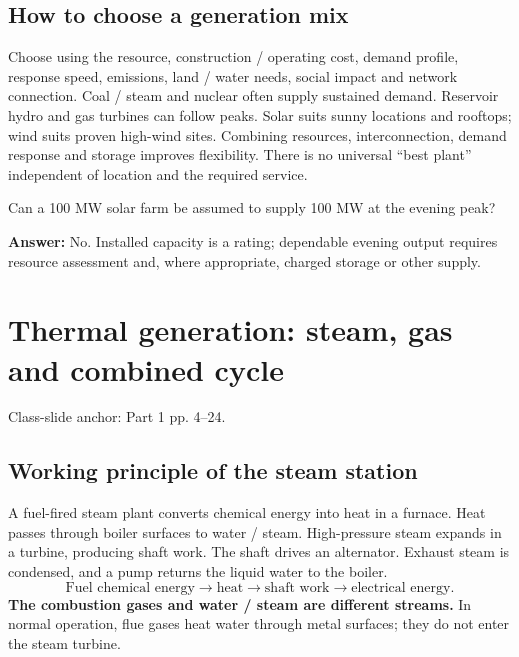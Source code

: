 \documentclass[11pt,a4paper]{article}
\newcommand{\slides}[1]{{\small\color{muted}\textsf{Class-slide anchor: #1.}}\par}
\newcommand{\chapterstart}[2]{\clearpage\section{#1}\label{#2}}
\newcommand{\checkq}[2]{\begin{tcolorbox}[breakable=false,colback=pale,colframe=teal,coltitle=white,title={Check your understanding}]#1\par\textbf{Answer:} #2\end{tcolorbox}}
\begin{document}
\subsection{How to choose a generation mix}
Choose using the resource, construction / operating cost, demand profile, response speed, emissions, land / water needs, social impact and network connection. Coal / steam and nuclear often supply sustained demand. Reservoir hydro and gas turbines can follow peaks. Solar suits sunny locations and rooftops; wind suits proven high-wind sites. Combining resources, interconnection, demand response and storage improves flexibility. There is no universal ``best plant'' independent of location and the required service.
\checkq{Can a 100 MW solar farm be assumed to supply 100 MW at the evening peak?}{No. Installed capacity is a rating; dependable evening output requires resource assessment and, where appropriate, charged storage or other supply.}

\chapterstart{Thermal generation: steam, gas and combined cycle}{thermal}
\slides{Part 1 pp. 4--24}
\subsection{Working principle of the steam station}
A fuel-fired steam plant converts chemical energy into heat in a furnace. Heat passes through boiler surfaces to water / steam. High-pressure steam expands in a turbine, producing shaft work. The shaft drives an alternator. Exhaust steam is condensed, and a pump returns the liquid water to the boiler.
\[
\text{Fuel chemical energy}\to\text{heat}\to\text{shaft work}\to\text{electrical energy}.
\]
\textbf{The combustion gases and water / steam are different streams.} In normal operation, flue gases heat water through metal surfaces; they do not enter the steam turbine.
\end{document}
